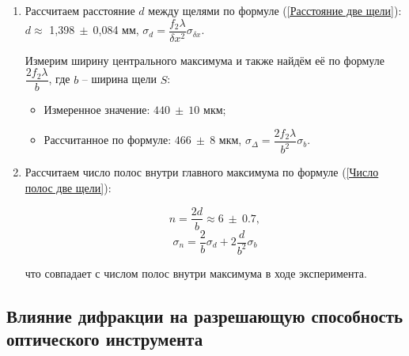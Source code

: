 \documentclass[a4paper, 12pt]{article}
\begin{document}
\begin{enumerate}
	\item Рассчитаем расстояние $d$ между щелями по формуле (\ref{Расстояние две щели}): $d \approx$ 1,398$~\pm~$0,084 мм, $\sigma_d = \dfrac{f_2 \lambda}{\delta x^2}\sigma_{\delta x}.$


	Измерим ширину центрального максимума и также найдём её по формуле $\dfrac{2f_2\lambda}{b}$, где $b$ -- ширина щели $S$:

	\begin{itemize}
		\item Измеренное значение: $440~\pm~10$ мкм;
		\item Рассчитанное по формуле: $466~\pm~8$ мкм, $\sigma_\Delta = \dfrac{2f_2 \lambda}{b^2}\sigma_{b}.$
	\end{itemize}

\item Рассчитаем число полос внутри главного максимума по формуле (\ref{Число полос две щели}):

\[n = \dfrac{2d}{b} \approx 6~\pm~0.7,\]
\[\sigma_n = \dfrac{2}{b}\sigma_d + 2\dfrac{d}{b^2}\sigma_b\]

что совпадает с числом полос внутри максимума в ходе эксперимента.
\end{enumerate}

\subsection{Влияние дифракции на разрешающую способность оптического инструмента}
\end{document}
